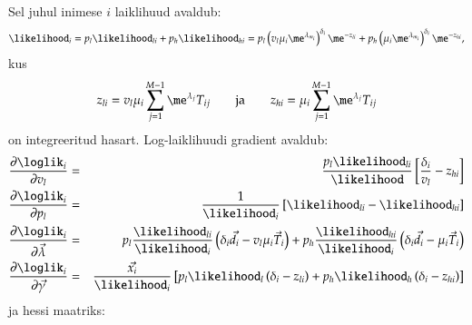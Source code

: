 \documentclass[a4paper]{article}
\numberwithin{equation}{subsection}
\begin{document}
Sel juhul inimese $i$ laiklihuud avaldub:
\begin{multline}
\likelihood_i = p_l \mathcal \likelihood_{li} + p_h \mathcal \likelihood_{hi} = 
%
p_l \left( v_l \mu_i \me^{\lambda_{m_i}} \right)^{\delta_i}
\me^{-z_{li}} +
p_h \left( \mu_i \me^{\lambda_{m_i}} \right)^{\delta_i}
\me^{-z_{hi}},
\end{multline}
kus
\begin{equation}
z_{li} = v_l \mu_i \sum_{j=1}^{M-1} \me^{\lambda_j} T_{ij}
\qquad\mbox{ja}\qquad
z_{hi} = \mu_i \sum_{j=1}^{M-1} \me^{\lambda_j} T_{ij}
\end{equation}
on integreeritud hasart.
Log-laiklihuudi gradient avaldub:
\begin{eqnarray}
\frac{\partial \loglik_i}{\partial v_l} & = &
\frac{p_l \likelihood_{li}}{\likelihood} \left[
  \frac{\delta_i}{v_l} - z_{hi}
  \right] \\
\frac{\partial \loglik_i}{\partial p_l} & = &
\frac{1}{\likelihood_i} \left[ \likelihood_{li} - \likelihood_{hi} \right]\\
\frac{\partial \loglik_i}{\partial \vec{\lambda}} & = &
p_l \frac{\likelihood_{li}}{\likelihood_i} \left(
  \delta_i \vec{d}_i - v_l \mu_i \vec{T}_i \right) +
p_h \frac{\likelihood_{hi}}{\likelihood_i} \left(
  \delta_i \vec{d}_i - \mu_i \vec{T}_i \right)\\
\frac{\partial \loglik_i}{\partial \vec{\gamma}} & = &
\frac{\vec{x_i}}{\likelihood_i} \left[
  p_l \likelihood_l \left( \delta_i - z_{li} \right) +
  p_h \likelihood_h \left( \delta_i - z_{hi} \right) \right]\\
\end{eqnarray}
ja hessi maatriks:
\end{document}
